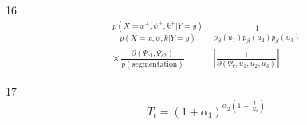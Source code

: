 \documentclass[10pt,letterpaper]{article}
\begin{document}
16
\begin{equation}
\begin{aligned}
\frac{p\left(X=x^{+}, \psi^{+}, k^{+} | Y=y\right)}{p(X=x, \psi, k | Y=y)} & \frac{1}{p_{\beta}\left(u_{1}\right) p_{\beta}\left(u_{2}\right) p_{\beta}\left(u_{3}\right)} \\
\times \frac{\partial\left(\Psi_{c 1}, \Psi_{c 2}\right)}{p(\text {segmentation})} &\left|\frac{1}{\partial\left(\Psi_{c}, u_{1}, u_{2}, u_{3}\right)}\right|
\end{aligned}
\end{equation}

17
\begin{equation}
T_{t}=\left(1+\alpha_{1}\right)^{\alpha_{2}\left(1-\frac{t}{N_{t}}\right)}
\end{equation}
\end{document}
